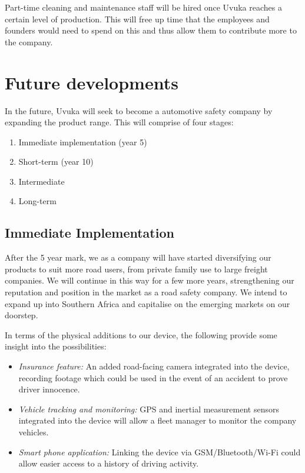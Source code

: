 Part-time cleaning and maintenance staff will be hired once Uvuka reaches a certain level of production. This will free up time that the employees and founders would need to spend on this and thus allow them to contribute more to the company.

\section{Future developments}
In the future, Uvuka will seek to become a automotive safety company by expanding the product range. This will comprise of four stages:
\begin{enumerate}
\item Immediate implementation (year 5)
\item Short-term (year 10)
\item Intermediate
\item Long-term
\end{enumerate}

\subsection{Immediate Implementation}
After the 5 year mark, we as a company will have started diversifying our products to suit more road users, from private family use to large freight companies. We will continue in this way for a few more years, strengthening our reputation and position in the market as a road safety company. We intend to expand up into Southern Africa and capitalise on the emerging markets on our doorstep.

In terms of the physical additions to our device, the following provide some insight into the possibilities:
\begin{itemize}
\item \textit{Insurance feature:} An added road-facing camera integrated into the device, recording footage which could be used in the event of an accident to prove driver innocence.

\item \textit{Vehicle tracking and monitoring:} GPS and inertial measurement sensors integrated into the device will allow a fleet manager to monitor the company vehicles.

\item \textit{Smart phone application:} Linking the device via GSM/Bluetooth/Wi-Fi could allow easier access to a history of driving activity.
\end{itemize}

